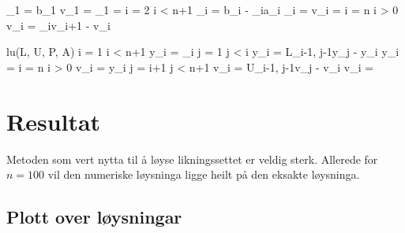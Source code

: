 \documentclass[11pt, a4paper]{article}
\begin{document}
    \begin{program}
      \lambda_1 = b_1
      v_1 = 
      \gamma_1 = 
      \FOR i = 2 \TO i < n+1 
        \lambda_i = b_i - \gamma_ia_i
        \gamma_i = 
        v_i = 
        \OD
      \FOR i = n \TO i > 0 
      v_i = \gamma_iv_{i+1} - v_i
      \OD
    \end{program}
    \begin{program}
      lu(L, U, P, A) 
      \FOR i = 1 \TO i < n+1 
      y_i = _i
      \FOR j = 1 \TO j < i 
        y_i = L_{i-1, j-1}y_j - y_i
        \OD
      y_i = 
      \OD
      \FOR i = n \TO i > 0 
        v_i = y_i
        \FOR j = i+1 \TO j < n+1 
          v_i = U_{i-1, j-1}v_j - v_i
          \OD
        v_i = 
        \OD
    \end{program}

    
\section{Resultat}
  Metoden som vert nytta til å løyse likningssettet er veldig sterk. Allerede for $n = 100$ vil 
  den numeriske løysninga ligge heilt på den eksakte løysninga. 

  \subsection{Plott over løysningar}
\end{document}
